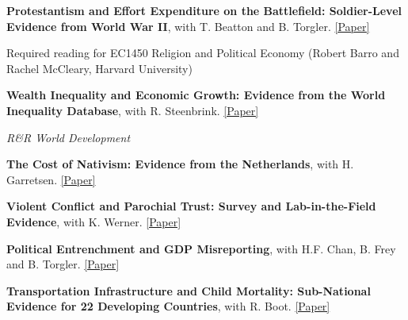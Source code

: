 \documentclass[letterpaper]{article}
\renewenvironment{itemize}{
  \begin{list}{}{
    \setlength{\leftmargin}{1.5em}
  }
}{
  \end{list}
}
\begin{document}
				\begin{itemize}
				
					\item \textbf{Protestantism and Effort Expenditure on the Battlefield: Soldier-Level Evidence from World War II}, with T. Beatton and B. Torgler. \href{https://ahmedskali.com/papers/ProtestantSoldiersAug2024.pdf}{[Paper]}
	
	\begin{itemize}
		\item 	Required reading for EC1450 Religion and Political Economy (Robert Barro and Rachel McCleary, Harvard University)
		\end{itemize}
		
		\medskip
				
						\item \textbf{Wealth Inequality and Economic Growth: Evidence from the World Inequality Database}, with R. Steenbrink.  \href{https://www.econstor.eu/handle/10419/289584}{[Paper]}
 
						\begin{itemize}
							\item \textit{R\&R World Development}
							\end{itemize}
	

	
		\medskip
	
		\item {\bf The Cost of Nativism: Evidence from the Netherlands}, with H. Garretsen. 
 \href{https://ahmedskali.com/papers/LanguagePaper.pdf}{[Paper]}
	
	\medskip
	
		\item \textbf{Violent Conflict and Parochial Trust: Survey and Lab-in-the-Field Evidence}, with K. Werner. \href{https://papers.ssrn.com/sol3/papers.cfm?abstract_id=4294035}{[Paper]}
	
\medskip
	
	\item {\bf Political Entrenchment and GDP Misreporting}, with H.F. Chan, B. Frey and B. Torgler. 
 \href{https://www.cesifo.org/DocDL/cesifo1_wp7653.pdf}{[Paper]}
	

		\medskip


		\item \textbf{Transportation Infrastructure and Child Mortality: Sub-National Evidence for 22 Developing Countries}, with R. Boot.  \href{https://ahmedskali.com/papers/TransportationCM.pdf}{[Paper]}
								
				\medskip	


\end{itemize}
\end{document}
